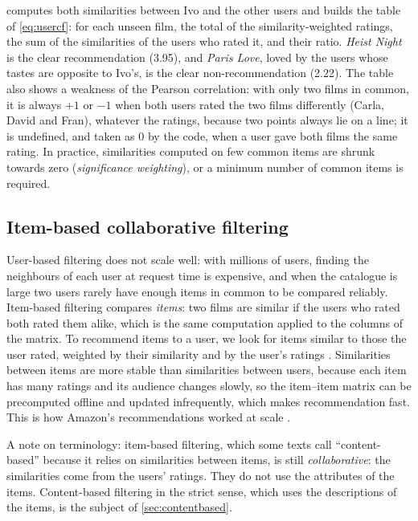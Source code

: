  computes both similarities between Ivo and the other users and builds the table of
\cref{eq:usercf}: for each unseen film, the total of the similarity-weighted ratings, the sum of the similarities of the
users who rated it, and their ratio. \emph{Heist Night} is the clear recommendation (3.95), and \emph{Paris Love}, loved
by the users whose tastes are opposite to Ivo's, is the clear non-recommendation (2.22). The table also shows a weakness of
the Pearson correlation: with only two films in common, it is always $+1$ or $-1$ when both users rated the two films differently
(Carla, David and Fran), whatever the ratings, because two points always lie on a line; it is undefined,
and taken as 0 by the code, when a user gave both films the same rating. In practice, similarities computed on few common items are shrunk towards
zero (\emph{significance weighting}), or a minimum number of common items is required.

\subsection{Item-based collaborative filtering}\label{sec:itemcf}

User-based filtering does not scale well: with millions of users, finding the neighbours of each user at request time is
expensive, and when the catalogue is large two users rarely have enough items in common to be compared reliably. Item-based filtering compares \emph{items}: two films are similar if the users who rated both rated them
alike, which is the same computation applied to the columns of the matrix. To recommend items to a user, we
look for items similar to those the user rated, weighted by their similarity and by the user's ratings
\citep{sarwar2001item}. Similarities between items are more stable than similarities between users, because each item has
many ratings and its audience changes slowly, so the item--item matrix can be precomputed offline and updated
infrequently, which makes recommendation fast. This is how Amazon's recommendations worked at scale
\citep{linden2003amazon}.

A note on terminology: item-based filtering, which some texts call ``content-based'' because it relies on similarities
between items, is still \emph{collaborative}: the similarities come from the users' ratings. They do not use the attributes of the items. Content-based filtering in the strict sense, which uses the descriptions of the items, is the subject of
\cref{sec:contentbased}.

